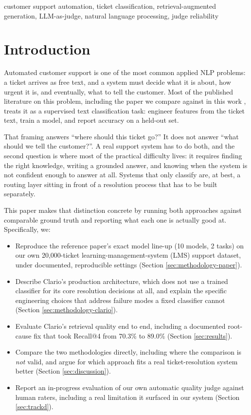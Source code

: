 \documentclass[conference]{IEEEtran}
\begin{document}
\begin{IEEEkeywords}
customer support automation, ticket classification, retrieval-augmented generation, LLM-as-judge, natural language processing, judge reliability
\end{IEEEkeywords}

\section{Introduction}

Automated customer support is one of the most common applied NLP problems: a ticket arrives as free text, and a system must decide what it is about, how urgent it is, and eventually, what to tell the customer. Most of the published literature on this problem, including the paper we compare against in this work \cite{selvi2025}, treats it as a supervised text classification task: engineer features from the ticket text, train a model, and report accuracy on a held-out set.

That framing answers ``where should this ticket go?'' It does not answer ``what should we tell the customer?''. A real support system has to do both, and the second question is where most of the practical difficulty lives: it requires finding the right knowledge, writing a grounded answer, and knowing when the system is not confident enough to answer at all. Systems that only classify are, at best, a routing layer sitting in front of a resolution process that has to be built separately.

This paper makes that distinction concrete by running both approaches against comparable ground truth and reporting what each one is actually good at. Specifically, we:

\begin{itemize}
\item Reproduce the reference paper's exact model line-up (10 models, 2 tasks) on our own 20,000-ticket learning-management-system (LMS) support dataset, under documented, reproducible settings (Section \ref{sec:methodology-paper}).
\item Describe Clario's production architecture, which does not use a trained classifier for its core resolution decisions at all, and explain the specific engineering choices that address failure modes a fixed classifier cannot (Section \ref{sec:methodology-clario}).
\item Evaluate Clario's retrieval quality end to end, including a documented root-cause fix that took Recall@4 from 70.3\% to 89.0\% (Section \ref{sec:results}).
\item Compare the two methodologies directly, including where the comparison is \emph{not} valid, and argue for which approach fits a real ticket-resolution system better (Section \ref{sec:discussion}).
\item Report an in-progress evaluation of our own automatic quality judge against human raters, including a real limitation it surfaced in our system (Section \ref{sec:trackd}).
\end{itemize}
\end{document}
